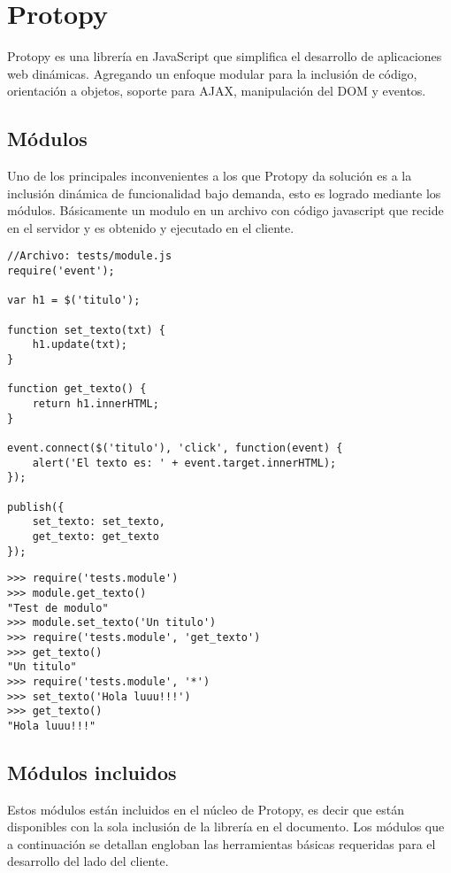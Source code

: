 \chapter{Protopy}
\label{ch:apendiceProtopy}
Protopy es una librería en JavaScript que simplifica el desarrollo de
aplicaciones web dinámicas. Agregando un enfoque modular para la inclusión de
código, orientación a objetos, soporte para AJAX, manipulación del DOM y
eventos.

\section{Módulos}
Uno de los principales inconvenientes a los que Protopy da solución es a la
inclusión dinámica de funcionalidad bajo demanda, esto es logrado mediante los
módulos. Básicamente un modulo en un archivo con código javascript que recide
en el servidor y es obtenido y ejecutado en el cliente.

\begin{lstlisting}[style=javascript,label=estructura-modulo,caption=Estructura
de un modulo]
//Archivo: tests/module.js
require('event');

var h1 = $('titulo');

function set_texto(txt) {
    h1.update(txt);
}

function get_texto() {
    return h1.innerHTML;
}

event.connect($('titulo'), 'click', function(event) {
    alert('El texto es: ' + event.target.innerHTML);
});

publish({
    set_texto: set_texto,
    get_texto: get_texto
});
\end{lstlisting}

\begin{lstlisting}[style=consola]
>>> require('tests.module')
>>> module.get_texto()
"Test de modulo"
>>> module.set_texto('Un titulo')
>>> require('tests.module', 'get_texto')
>>> get_texto()
"Un titulo"
>>> require('tests.module', '*')
>>> set_texto('Hola luuu!!!')
>>> get_texto()
"Hola luuu!!!"
\end{lstlisting}

\section{Módulos incluidos}
Estos módulos están incluidos en el núcleo de Protopy, es decir que están
disponibles con la sola inclusión de la librería en el documento.
Los módulos que a continuación se detallan engloban las herramientas básicas
requeridas para el desarrollo del lado del cliente.
